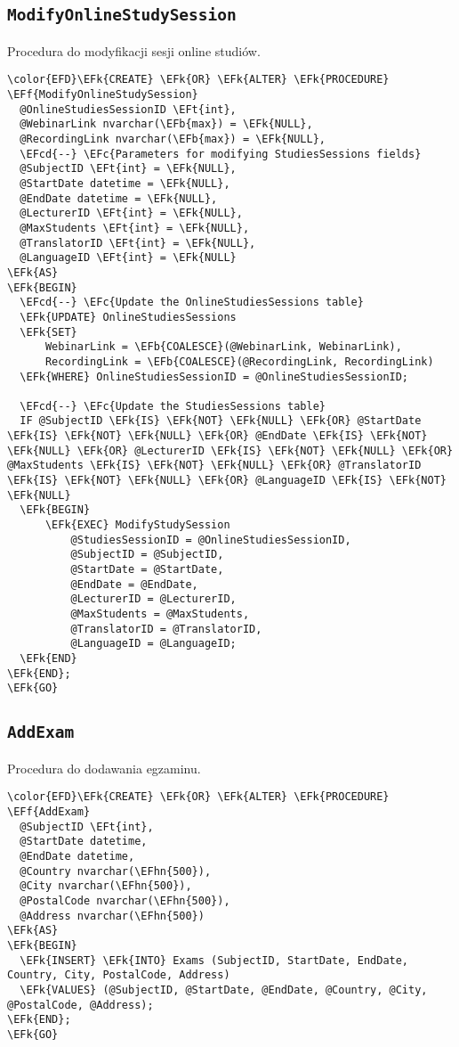 \documentclass[11pt]{article}
\newcommand{\EFc}[1]{\textcolor{EFc}{\textit{#1}}} %
\newcommand{\EFcd}[1]{\textcolor{EFcd}{\textit{#1}}} %
\newcommand{\EFk}[1]{\textcolor{EFk}{\textbf{#1}}} %
\newcommand{\EFb}[1]{\textcolor{EFb}{\textbf{#1}}} %
\newcommand{\EFf}[1]{\textcolor{EFf}{#1}} %
\newcommand{\EFt}[1]{\textcolor{EFt}{\textbf{#1}}} %
\newcommand{\EFhn}[1]{\textcolor{EFhn}{#1}} %
\begin{document}
\subsection{\texttt{ModifyOnlineStudySession}}
\label{sec:org963f03f}
Procedura do modyfikacji sesji online studiów.
\begin{Code}
\begin{Verbatim}
\color{EFD}\EFk{CREATE} \EFk{OR} \EFk{ALTER} \EFk{PROCEDURE} \EFf{ModifyOnlineStudySession}
  @OnlineStudiesSessionID \EFt{int},
  @WebinarLink nvarchar(\EFb{max}) = \EFk{NULL},
  @RecordingLink nvarchar(\EFb{max}) = \EFk{NULL},
  \EFcd{--} \EFc{Parameters for modifying StudiesSessions fields}
  @SubjectID \EFt{int} = \EFk{NULL},
  @StartDate datetime = \EFk{NULL},
  @EndDate datetime = \EFk{NULL},
  @LecturerID \EFt{int} = \EFk{NULL},
  @MaxStudents \EFt{int} = \EFk{NULL},
  @TranslatorID \EFt{int} = \EFk{NULL},
  @LanguageID \EFt{int} = \EFk{NULL}
\EFk{AS}
\EFk{BEGIN}
  \EFcd{--} \EFc{Update the OnlineStudiesSessions table}
  \EFk{UPDATE} OnlineStudiesSessions
  \EFk{SET} 
      WebinarLink = \EFb{COALESCE}(@WebinarLink, WebinarLink),
      RecordingLink = \EFb{COALESCE}(@RecordingLink, RecordingLink)
  \EFk{WHERE} OnlineStudiesSessionID = @OnlineStudiesSessionID;

  \EFcd{--} \EFc{Update the StudiesSessions table}
  IF @SubjectID \EFk{IS} \EFk{NOT} \EFk{NULL} \EFk{OR} @StartDate \EFk{IS} \EFk{NOT} \EFk{NULL} \EFk{OR} @EndDate \EFk{IS} \EFk{NOT} \EFk{NULL} \EFk{OR} @LecturerID \EFk{IS} \EFk{NOT} \EFk{NULL} \EFk{OR} @MaxStudents \EFk{IS} \EFk{NOT} \EFk{NULL} \EFk{OR} @TranslatorID \EFk{IS} \EFk{NOT} \EFk{NULL} \EFk{OR} @LanguageID \EFk{IS} \EFk{NOT} \EFk{NULL}
  \EFk{BEGIN}
      \EFk{EXEC} ModifyStudySession 
          @StudiesSessionID = @OnlineStudiesSessionID,
          @SubjectID = @SubjectID, 
          @StartDate = @StartDate, 
          @EndDate = @EndDate, 
          @LecturerID = @LecturerID, 
          @MaxStudents = @MaxStudents, 
          @TranslatorID = @TranslatorID, 
          @LanguageID = @LanguageID;
  \EFk{END}
\EFk{END};
\EFk{GO}
\end{Verbatim}
\end{Code}
\subsection{\texttt{AddExam}}
\label{sec:org3105035}
Procedura do dodawania egzaminu.
\begin{Code}
\begin{Verbatim}
\color{EFD}\EFk{CREATE} \EFk{OR} \EFk{ALTER} \EFk{PROCEDURE} \EFf{AddExam}
  @SubjectID \EFt{int},
  @StartDate datetime,
  @EndDate datetime,
  @Country nvarchar(\EFhn{500}),
  @City nvarchar(\EFhn{500}),
  @PostalCode nvarchar(\EFhn{500}),
  @Address nvarchar(\EFhn{500})
\EFk{AS}
\EFk{BEGIN}
  \EFk{INSERT} \EFk{INTO} Exams (SubjectID, StartDate, EndDate, Country, City, PostalCode, Address)
  \EFk{VALUES} (@SubjectID, @StartDate, @EndDate, @Country, @City, @PostalCode, @Address);
\EFk{END};
\EFk{GO}
\end{Verbatim}
\end{Code}
\end{document}
